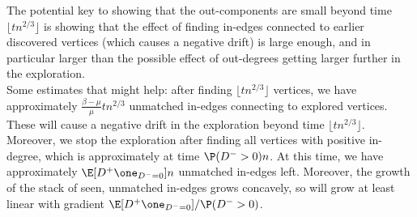 The potential key to showing that the out-components are small beyond time $\lfloor t n^{2/3} \rfloor$ is showing that the effect of finding in-edges connected to earlier discovered vertices (which causes a negative drift) is large enough, and in particular larger than the possible effect of out-degrees getting larger further in the exploration. \\
Some estimates that might help: after finding $\lfloor t n^{2/3} \rfloor$ vertices, we have approximately $\frac{\beta-\mu}{\mu} t n^{2/3}$ unmatched in-edges connecting to explored vertices. These will cause a negative drift in the exploration beyond time $\lfloor t n^{2/3} \rfloor$. Moreover, we stop the exploration after finding all vertices with positive in-degree, which is approximately at time $\P(D^->0)n$. At this time, we have approximately $\E[D^+ \one_{D^-=0}] n$ unmatched in-edges left. Moreover, the growth of the stack of seen, unmatched in-edges grows concavely, so will grow at least linear with gradient $\E[D^+ \one_{D^-=0}]/\P(D^->0)$. 

